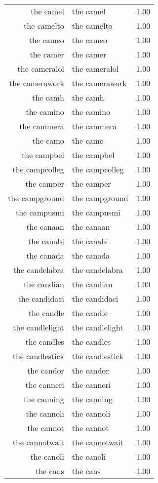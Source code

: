 \begin{table}[ht]
\begin{tabular}{rlr}
  the camel & the camel & 1.00 \\ 
  the camelto & the camelto & 1.00 \\ 
  the cameo & the cameo & 1.00 \\ 
  the camer & the camer & 1.00 \\ 
  the cameralol & the cameralol & 1.00 \\ 
  the camerawork & the camerawork & 1.00 \\ 
  the camh & the camh & 1.00 \\ 
  the camino & the camino & 1.00 \\ 
  the cammera & the cammera & 1.00 \\ 
  the camo & the camo & 1.00 \\ 
  the campbel & the campbel & 1.00 \\ 
  the campcolleg & the campcolleg & 1.00 \\ 
  the camper & the camper & 1.00 \\ 
  the campground & the campground & 1.00 \\ 
  the campusmi & the campusmi & 1.00 \\ 
  the canaan & the canaan & 1.00 \\ 
  the canabi & the canabi & 1.00 \\ 
  the canada & the canada & 1.00 \\ 
  the candelabra & the candelabra & 1.00 \\ 
  the candian & the candian & 1.00 \\ 
  the candidaci & the candidaci & 1.00 \\ 
  the candle & the candle & 1.00 \\ 
  the candlelight & the candlelight & 1.00 \\ 
  the candles & the candles & 1.00 \\ 
  the candlestick & the candlestick & 1.00 \\ 
  the candor & the candor & 1.00 \\ 
  the canneri & the canneri & 1.00 \\ 
  the canning & the canning & 1.00 \\ 
  the cannoli & the cannoli & 1.00 \\ 
  the cannot & the cannot & 1.00 \\ 
  the cannotwait & the cannotwait & 1.00 \\ 
  the canoli & the canoli & 1.00 \\ 
  the cans & the cans & 1.00 \\ 

\end{tabular}
\end{table}
